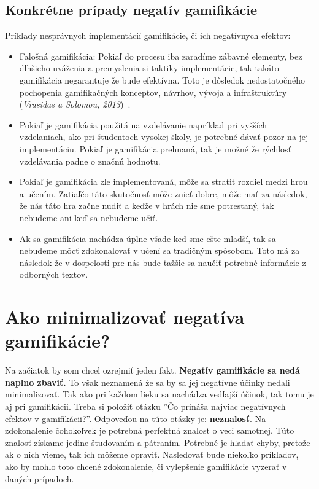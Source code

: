\documentclass[10pt,oneside,slovak,a4paper]{article}
\begin{document}
\subsection{Konkrétne prípady negatív gamifikácie} \label{NegativnePriklady}

Príklady nesprávnych implementácií gamifikácie, či ich negatívnych efektov:
\begin{itemize}
\item Falošná gamifikácia: Pokiaľ do procesu iba zaradíme zábavné elementy, bez dlhšieho uváženia a premyslenia si taktiky implementácie, tak takáto gamifikácia negarantuje že bude efektívna. Toto je dôsledok nedostatočného pochopenia gamifikačných konceptov, návrhov, vývoja a infraštruktúry (\emph{Vrasidas a Solomou, 2013})~\cite{doi:10.1080/09523987.2013.839151}.
\item Pokiaľ je gamifikácia použitá na vzdelávanie napríklad pri vyšších vzdelaniach, ako pri študentoch vysokej školy, je potrebné dávať pozor na jej implementáciu. Pokiaľ je gamifikácia prehnaná, tak je možné že rýchlosť vzdelávania padne o značnú hodnotu.
\item Pokiaľ je gamifikácia zle implementovaná, môže sa stratiť rozdiel medzi hrou a učením. Zatiaľčo táto skutočnosť môže znieť dobre, môže mať za následok, že nás táto hra začne nudiť a keďže v hrách nie sme potrestaný, tak nebudeme ani keď sa nebudeme učiť.
\item Ak sa gamifikácia nachádza úplne všade keď sme ešte mladší, tak sa nebudeme môcť zdokonalovať v učení sa tradičným spôsobom. Toto má za následok že v dospelosti pre nás bude ťažšie sa naučiť potrebné informácie z odborných textov.
\end{itemize}




\section{Ako minimalizovať negatíva gamifikácie?} \label{MinimalizovanieNegatGamif}
Na začiatok by som chcel ozrejmiť jeden fakt. \textbf{Negatív gamifikácie sa nedá naplno zbaviť.} To však neznamená že sa by sa jej negatívne účinky nedali minimalizovať. Tak ako pri každom lieku sa nachádza vedľajší účinok, tak tomu je aj pri gamifikácii. Treba si položiť otázku ''Čo prináša najviac negatívnych efektov v gamifikácii?''. Odpoveďou na túto otázky je: \textbf{neznalosť}. Na zdokonalenie čohokoľvek je potrebná perfektná znalosť o veci samotnej. Túto znalosť získame jedine študovaním a pátraním. Potrebné je hľadať chyby, pretože ak o nich vieme, tak ich môžeme opraviť. Nasledovať bude niekoľko príkladov, ako by mohlo toto chcené zdokonalenie, či vylepšenie gamifikácie vyzerať v daných prípadoch.
\end{document}
